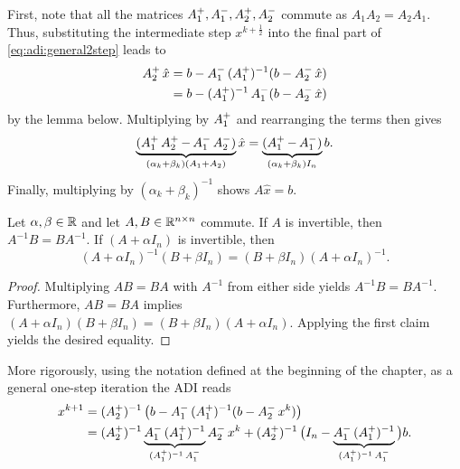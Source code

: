 First, note that all the matrices $\mathop{A_1^+}, \mathop{A_1^-}, \mathop{A_2^+}, \mathop{A_2^-}$ commute as $A_1A_2 = A_2A_1$.
Thus, substituting the intermediate step $x^{k+\frac{1}{2}}$ into the final part of \eqref{eq:adi:general2step} leads to
\begin{align*}
  \mathop{A_2^+} \hat x
  &= b - \mathop{A_1^-} \mathop{(\mathop{A_1^+})^{-1}} (b - \mathop{A_2^-} \hat x) \\
  &= b - \mathop{(\mathop{A_1^+})^{-1}} \mathop{A_1^-} (b - \mathop{A_2^-} \hat x)
\end{align*}
by the lemma below.
Multiplying by $\mathop{A_1^+}$ and rearranging the terms then gives
\begin{equation*}
  \underbrace{%
  (\Aip \Aiip - \Aim \Aiim)
  }_{(\alpha_k + \beta_k) (A_1+A_2)}
  \hat x =
  \underbrace{%
  (\Aip - \Aim)
  }_{(\alpha_k + \beta_k) I_n}
  b
  .
\end{equation*}
Finally, multiplying by $(\alpha_k + \beta_k)^{-1}$ shows $A \hat x = b$.

\begin{lemma}
\label{thm:adi:commuting-matrices}
  Let $\alpha, \beta\in\mathbb{R}$ and let $A, B \in\mathbb{R}^{n\times n}$ commute.
  If $A$ is invertible, then $A^{-1}B = BA^{-1}$.
  If $(A+\alpha I_n)$ is invertible, then
  \begin{equation*}
    (A+\alpha I_n)^{-1} (B+\beta I_n)
    =
    (B+\beta I_n) (A+\alpha I_n)^{-1}
    .
  \end{equation*}
\end{lemma}
\begin{proof}
  Multiplying $AB=BA$ with $A^{-1}$ from either side yields $A^{-1}B=BA^{-1}$.
  Furthermore, $AB=BA$ implies
  $
    (A+\alpha I_n) (B+\beta I_n)
    =
    (B+\beta I_n) (A+\alpha I_n)
  $.
  Applying the first claim yields the desired equality.
\end{proof}


More rigorously,
using the notation defined at the beginning of the chapter,
as a general one-step iteration the \ac{ADI} reads
\begin{equation*}
\begin{aligned}
  x^{k+1}
  &= \mathop{(\mathop{A_2^+})^{-1}} \big( b - \mathop{A_1^-} \mathop{(\mathop{A_1^+})^{-1}} (b - \mathop{A_2^-} x^k) \big) \\
  &= \mathop{(\mathop{A_2^+})^{-1}} \underbrace{
    \mathop{A_1^-} \mathop{(\mathop{A_1^+})^{-1}}
  }_{
    \mathop{(\mathop{A_1^+})^{-1}} \mathop{A_1^-}
  }
  \mathop{A_2^-} x^k + \mathop{(\mathop{A_2^+})^{-1}} \big( I_n - \underbrace{
    \mathop{A_1^-} \mathop{(\mathop{A_1^+})^{-1}}
  }_{
    \mathop{(\mathop{A_1^+})^{-1}} \mathop{A_1^-}
  }
  \big) b
  .
\end{aligned}
\end{equation*}

